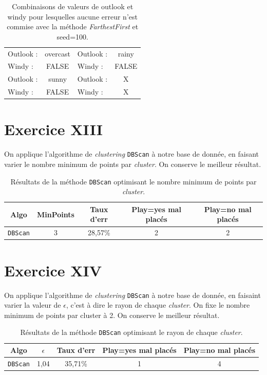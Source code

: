\documentclass[a4paper, 11pt]{report}
\begin{document}
	\begin{table}[h!]
		\centering
		\begin{tabular}{|l|c|l|c|}
			\hline
			Outlook : & overcast  & Outlook : & rainy \\
			Windy : & FALSE & Windy : & FALSE \\
			\hline
			Outlook : & sunny & Outlook : & X \\
			Windy : & FALSE & Windy : & X \\
			\hline
		\end{tabular}
		\caption{Combinaisons de valeurs de outlook et windy pour lesquelles aucune erreur n'est commise avec la méthode \emph{FarthestFirst} et seed=100.}
		\label{tab:exo12}
	\end{table}

        \section{Exercice XIII}
        	On applique l'algorithme de \emph{clustering} \texttt{DBScan} à notre base de donnée, en faisant varier le nombre minimum de points par \emph{cluster}. On conserve le meilleur résultat.

    	\begin{table}[h!]
    		\centering
    		\begin{tabular}{|c|c|c|c|c|}
    		\hline
    		Algo & MinPoints & Taux d'err & Play=yes mal placés & Play=no mal placés \\
    		\hline
    		\texttt{DBScan} & 3 & 28,57\% & 2 & 2\\
    		\hline
    		\end{tabular}
    		\caption{Résultats de la méthode \texttt{DBScan} optimisant le nombre minimum de points par \emph{cluster}.}
        	\label{tab:exo13}
    	\end{table}



    	\section{Exercice XIV}
    		On applique l'algorithme de \emph{clustering} \texttt{DBScan} à notre base de donnée, en faisaint varier la valeur de $\epsilon$, c'est à dire le rayon de chaque \emph{cluster}. On fixe le nombre minimum de points par cluster à 2. On conserve le meilleur résultat.

		\begin{table}[h!]
			\centering
			\begin{tabular}{|c|c|c|c|c|}
				\hline
				Algo & $\epsilon$ & Taux d'err & Play=yes mal placés & Play=no mal placés \\
				\hline
				\texttt{DBScan} & 1,04 & 35,71\% & 1 & 4 \\
				\hline
			\end{tabular}
			\caption{Résultats de la méthode \texttt{DBScan} optimisant le rayon de chaque \emph{cluster}.}
        	\label{tab:exo14}
		\end{table}
\end{document}
